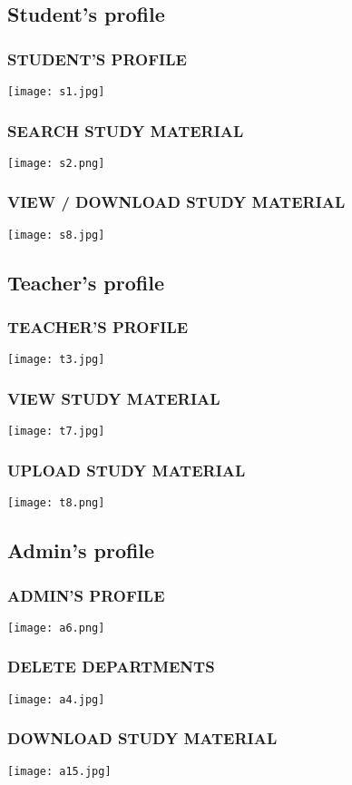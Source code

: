\documentclass{beamer}
\begin{document}
\subsection{Student's profile}
\begin{frame}\frametitle{STUDENT'S PROFILE}
		\texttt{[image: s1.jpg]}
\end{frame}

\begin{frame}\frametitle{SEARCH STUDY MATERIAL}
		\texttt{[image: s2.png]}
\end{frame}

\begin{frame}\frametitle{VIEW / DOWNLOAD STUDY MATERIAL}
		\texttt{[image: s8.jpg]}
\end{frame}



\subsection{Teacher's profile}
\begin{frame}\frametitle{TEACHER'S PROFILE}
		\texttt{[image: t3.jpg]}
\end{frame}

\begin{frame}\frametitle{VIEW STUDY MATERIAL}
		\texttt{[image: t7.jpg]}
\end{frame}

\begin{frame}\frametitle{UPLOAD STUDY MATERIAL}
		\texttt{[image: t8.png]}
\end{frame}



\subsection{Admin's profile}
\begin{frame}\frametitle{ADMIN'S PROFILE}
		\texttt{[image: a6.png]}
\end{frame}

\begin{frame}\frametitle{DELETE DEPARTMENTS}
		\texttt{[image: a4.jpg]}
\end{frame}


\begin{frame}\frametitle{DOWNLOAD STUDY MATERIAL}
		\texttt{[image: a15.jpg]}
\end{frame}
\end{document}

